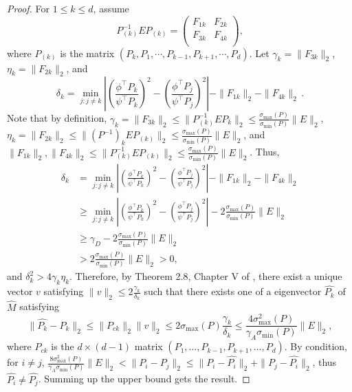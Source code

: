 \begin{proof}
For $1\le k\le d$, assume 
\[
P_{(k)}^{-1} E P_{(k)} =  
\left(
\begin{array}{cc}
F_{1k} & F_{2k}\\
F_{3k} & F_{4k} \\
\end{array} 
\right), 
\]
where $P_{(k)}$ is the matrix $(P_k, P_1, \cdots, P_{k-1}, P_{k+1}, \cdots, P_d)$.
Let $\gamma_k = \|F_{3k}\|_2$, $\eta_k = \|F_{2k}\|_2$, and 
\[
\delta_k = \min_{j: j\neq k} 
\left\vert \left(\frac{\phi^{\top}P_k}{\psi^{\top}P_k}\right)^2 -\left( \frac{\phi^{\top}P_j}{\psi^{\top}P_j}\right)^2 \right\vert - \|F_{1k}\|_2 - \|F_{4k}\|_2\,.
\]
Note that by definition, $\gamma_k = \|F_{3k}\|_2\le\|P_{(k)}^{-1}EP_{k}\|_2\le\frac{\sigma_{\max}(P)}{\sigma_{\min}(P)}\|E\|_2$,
 $\eta_k = \|F_{2k}\|_2\le\|(P^{-1})_kEP_{(k)}\|_2\le\frac{\sigma_{\max}(P)}{\sigma_{\min}(P)}\|E\|_2$, 
 and $\|F_{1k}\|_2,\|F_{4k}\|_2\le\|P_{(k)}^{-1} E P_{(k)}\|_2\le\frac{\sigma_{\max}(P)}{\sigma_{\min}(P)}\|E\|_2$. 
 Thus,
\begin{align*}
\delta_k & = \min_{j:j\neq k} 
	\left\vert \left(\frac{\phi^{\top}P_k}{\psi^{\top}P_k}\right)^2 - \left(\frac{\phi^{\top}P_j}{\psi^{\top}P_j}\right)^2 \right\vert - \|F_{1k}\|_2 - \|F_{4k}\|_2\\
	& \ge \min_{j:j\neq k} \left\vert \left(\frac{\phi^{\top}P_k}{\psi^{\top}P_k}\right)^2 - \left(\frac{\phi^{\top}P_j}{\psi^{\top}P_j}\right)^2 \right\vert - 2 \frac{\sigma_{\max}(P)}{\sigma_{\min}(P)}\|E\|_2\\
	& \ge  \gamma_D -  2 \frac{\sigma_{\max}(P)}{\sigma_{\min}(P)}\|E\|_2 \\
	& >  2 \frac{\sigma_{\max}(P)}{\sigma_{\min}(P)}\|E\|_2 >0,
\end{align*}
and $\delta_k^2 > 4\gamma_k\eta_k$. 
Therefore, by Theorem 2.8, Chapter V of \citep{stewart1990matrix}, there exist a unique vector $v$ satisfying $\|v\|_2\le 2\frac{\gamma_k}{\delta_k}$ such that there exists one of a eigenvector $\hat{P_k}$ of $\hat{M}$ satisfying
 \[
 \|\hat{P_k} - P_k\|_2 \le \|P_{ck}\|_2 \|v\|_2 \le 2\sigma_{\max}(P)\frac{\gamma_k}{\delta_k}
 \le 
 \frac{4\sigma_{\max}^2(P)}{\gamma_A \sigma_{\min}(P)} \|E\|_2,
 \]
 where $P_{ck}$ is the $d\times (d-1)$ matrix $(P_1,\ldots,P_{k-1}, P_{k+1},\ldots,P_d)$.
 By condition, for $i\neq j$,  $\frac{8\sigma_{\max}^2(P)}{\gamma_A \sigma_{\min}(P)} \|E\|_2 < \|P_i - P_j\|_2\le \|P_i - \hat{P_i}\|_2 + \|P_j - \hat{P_i}\|_2$, thus $\hat{P_i} \neq \hat{P_j}$.  Summing up the upper bound gets the result. 
\end{proof}
